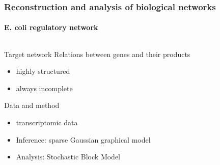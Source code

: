 \documentclass{beamer}\usepackage[]{graphicx}\usepackage[]{color}
\begin{document}
\begin{frame}
  \frametitle{Reconstruction and analysis of biological networks} 
  \framesubtitle{E. coli regulatory network}  

  \begin{columns}
    \begin{column}{.4\textwidth}
      \begin{small}
        \begin{block}{Target network}
          Relations between genes and their products
          \begin{itemize}
          \item highly structured
          \item always incomplete
          \end{itemize}
        \end{block}
      \end{small}
      \begin{small}
        \begin{block}{Data and method}
          \begin{itemize}
          \item transcriptomic data
          \item \alert{Inference}: sparse Gaussian graphical model
          \item \alert{Analysis}: Stochastic Block Model
          \end{itemize}
        \end{block}
      \end{small}
    \end{column}
    \begin{column}{.55\textwidth}

\end{column}
\end{columns}
\end{frame}
\end{document}
